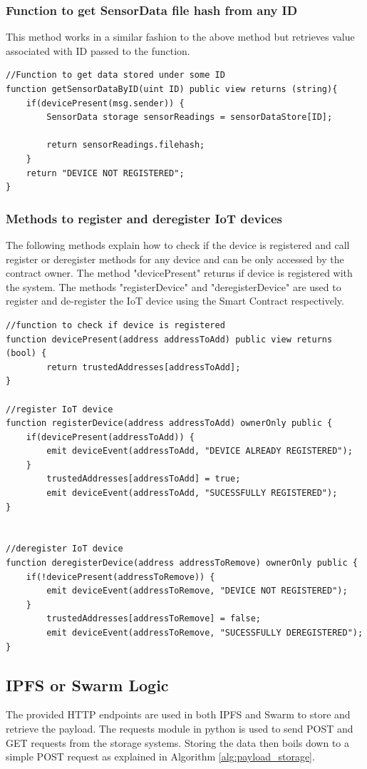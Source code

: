 \documentclass[11pt,openright]{report}
\begin{document}
\subsubsection{Function to get SensorData file hash from any ID}
This method works in a similar fashion to the above method but retrieves value associated with ID passed to the function.

\begin{verbatim}
//Function to get data stored under some ID
function getSensorDataByID(uint ID) public view returns (string){
    if(devicePresent(msg.sender)) {
        SensorData storage sensorReadings = sensorDataStore[ID];

        return sensorReadings.filehash;
    }
    return "DEVICE NOT REGISTERED";
}
\end{verbatim}

\subsubsection{Methods to register and deregister IoT devices}
The following methods explain how to check if the device is registered and call register or deregister methods for any device and can be only accessed by the contract owner. 
The method "devicePresent" returns if device is registered with the system.
The methods "registerDevice" and "deregisterDevice" are used to register and de-register the IoT device using the Smart Contract respectively.
\begin{verbatim}
//function to check if device is registered
function devicePresent(address addressToAdd) public view returns (bool) {
        return trustedAddresses[addressToAdd];
}

//register IoT device
function registerDevice(address addressToAdd) ownerOnly public {
    if(devicePresent(addressToAdd)) {
        emit deviceEvent(addressToAdd, "DEVICE ALREADY REGISTERED");
    }
        trustedAddresses[addressToAdd] = true;
        emit deviceEvent(addressToAdd, "SUCESSFULLY REGISTERED");
}


//deregister IoT device
function deregisterDevice(address addressToRemove) ownerOnly public {
    if(!devicePresent(addressToRemove)) {
        emit deviceEvent(addressToRemove, "DEVICE NOT REGISTERED");
    }
        trustedAddresses[addressToRemove] = false;
        emit deviceEvent(addressToRemove, "SUCESSFULLY DEREGISTERED");
}
\end{verbatim}
\newpage

\subsection{IPFS or Swarm Logic}
The provided HTTP endpoints are used in both IPFS and Swarm to store and retrieve the payload. The requests module in python is used to send POST and GET requests from the storage systems. Storing the data then boils down to a simple POST request as explained in Algorithm \ref{alg:payload_storage}.
\end{document}
